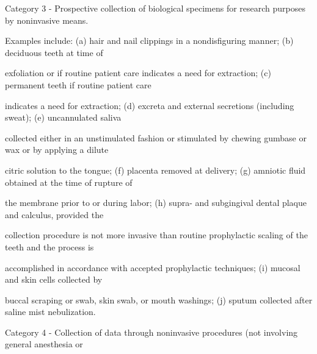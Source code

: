 \documentclass[10pt, letterpaper]{article}
\begin{document}
\noindent \makebox[0pt][l]{$\square$}\hspace{1.2em} Category 3 - Prospective collection of biological specimens for research purposes by noninvasive means.

\begin{responsebox}

Examples include: (a) hair and nail clippings in a nondisfiguring manner; (b) deciduous teeth at time of

exfoliation or if routine patient care indicates a need for extraction; (c) permanent teeth if routine patient care

indicates a need for extraction; (d) excreta and external secretions (including sweat); (e) uncannulated saliva

collected either in an unstimulated fashion or stimulated by chewing gumbase or wax or by applying a dilute

citric solution to the tongue; (f) placenta removed at delivery; (g) amniotic fluid obtained at the time of rupture of

the membrane prior to or during labor; (h) supra- and subgingival dental plaque and calculus, provided the

collection procedure is not more invasive than routine prophylactic scaling of the teeth and the process is

accomplished in accordance with accepted prophylactic techniques; (i) mucosal and skin cells collected by

buccal scraping or swab, skin swab, or mouth washings; (j) sputum collected after saline mist nebulization.

\end{responsebox}

\noindent \makebox[0pt][l]{$\square$}\hspace{1.2em} Category 4 - Collection of data through noninvasive procedures (not involving general anesthesia or
\end{document}
